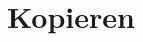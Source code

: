 \documentclass[a4paper,10pt]{article}
\newcommand{\anf}[1]{»#1«}
\newcommand{\inanf}[1]{›#1‹}
\begin{document}
\begin{comment}

 
Für die Coda:
 
Was liegt nun näher als diese abgründige Geschichte über die \anf{Verzweigung in der Zeit}\footcite[169]{borges:1941} als eine Art literarische Präfiguration der informatischen Versionskontrolle einzuordnen. Ja, sicher. 

Borges und die unterschiedlichen Zeitebenen, die in der Fiktion sich anbieten... Dies in Analogie zu unterschiedlichen Entwicklungszeiten bei der Softwareproduktion. 


Alternative Entwürfe sichern

Überblick bewahren. Version und Kontrolle. Diese Eigenschaften sind freilich auch bei der klassischen, das heisst philologischen Edition von Texten erforderlich. \anf{Ich habe Hunderte von Handschriften miteinander verglichen, habe die Fehler korrigiert, die sich durch die Nachlässigkeit der Abschreiber eingeschlichen haben; ich habe den Plan dieses Chaos erschossen, habe die ursprüngliche Ordnung wieder hergestellt}.\footcite[172]{borges:1941}

	***

Joethes Delegationen

Ein weiterer Aspekt
Verzweigen als Delegieren [Dies seinerseits als Abzweigung kennzeichnen...]
Goethes Verzweigungen: Seine lahme Tintenhand.

Sieben: 185–197.

Einbauen: 
"Alle Subalternen nehmen in spezifischer Weise eine Eigenart an, die sie ihrem Herrn und Gebieter ähnlicher werden läßt. Johann Georg Paul Götze, der rund 17 Jahre bei Goethen dient, gelingt es beispielsweise,...Der Meister dupliziert sich in seinen Domestiken."

	***


Siehe auch Schlagwort \inanf{Verzweigung} in Synapsen...

\end{comment}


\section{Kopieren}
\end{document}
